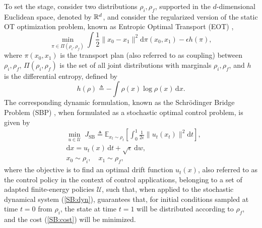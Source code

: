 \documentclass[twoside]{article}
\newtheorem{problem}{Problem}
\renewcommand{\eqref}[1]{(\ref{#1})}
\renewcommand{\E}{\mathbb{E}}
\renewcommand{\d}{\mathrm{d}}
\begin{document}
To set the stage, consider two distributions $\rho_i, \rho_f$, supported in the $d$-dimensional Euclidean space, denoted by ${\mathbb{R}}^d$, and consider the regularized version of the static OT optimization problem, known as Entropic Optimal Transport (EOT) \citep{peyre2017computational},  
\begin{equation} \label{EOT}
        \min_{\pi \in \Pi(\rho_i, \rho_f)} \int{ \frac{1}{2} \| x_0 - x_1\|^2 \d \pi(x_0, x_1)} - \epsilon h (\pi),
\end{equation}
where $\pi(x_0, x_1)$ is the transport plan (also referred to as coupling) between $\rho_i, \rho_f$, $\Pi(\rho_i, \rho_f)$ is the set of all joint distributions with marginals $\rho_i, \rho_f$, and $h$ is the differential entropy, defined by 
\begin{equation}
    h(\rho) \triangleq - \int \rho(x) \log \rho(x) \, \d x.
\end{equation}
The corresponding dynamic formulation, known as the Schr\"{o}dinger Bridge Problem (SBP) \citep{leonard2014survey, chen2021stochastic}, when formulated as a stochastic optimal control problem, is given by
\begin{subequations} \label{SB}
\begin{align}
& \min_{u \in \mathcal{U}} \; J_{\mathrm{SB}} \triangleq \E_{x_t \sim \rho_t} \left[ \int_{0}^{1}{ \frac{1}{2 \epsilon} \| u_t(x_t) \|^2 \d t} \right], \label{SB:cost} \\
& \d x = u_t(x) \, \d t + \sqrt{\epsilon} \, \d w, \label{SB:dyn} \\
& x_0 \sim \rho_i, \quad x_1 \sim \rho_f,
\end{align}
\end{subequations}
where the objective is to find an optimal drift function $u_t(x)$, also referred to as the control policy in the context of control applications, belonging to a set of adapted finite-energy policies $\mathcal{U}$, such that, when applied to the stochastic dynamical system \eqref{SB:dyn}, guarantees that, for initial conditions sampled at time $t=0$  from $\rho_i$, the
state at time $t=1$ will be distributed according to $\rho_f$, and the cost \eqref{SB:cost} will be minimized.
\end{document}
